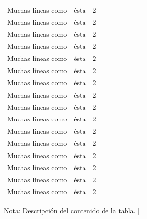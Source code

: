 {\begin{longtable}{p{2in}cc}
Muchas líneas como & ésta & 2 \\
Muchas líneas como & ésta & 2 \\
Muchas líneas como & ésta & 2 \\
Muchas líneas como & ésta & 2 \\
Muchas líneas como & ésta & 2 \\
Muchas líneas como & ésta & 2 \\
Muchas líneas como & ésta & 2 \\
Muchas líneas como & ésta & 2 \\
Muchas líneas como & ésta & 2 \\
Muchas líneas como & ésta & 2 \\
Muchas líneas como & ésta & 2 \\
Muchas líneas como & ésta & 2 \\
Muchas líneas como & ésta & 2 \\
Muchas líneas como & ésta & 2 \\
Muchas líneas como & ésta & 2 \\
Muchas líneas como & ésta & 2 \\
\end{longtable}}
\setlength{\parskip}{-1mm}
Nota: Descripción del contenido de la tabla. [ ] %
\setlength{\parskip}{2em}
